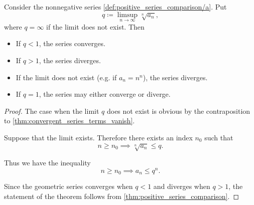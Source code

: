 \begin{proposition}\label{thm:cauchys_root_test}\cite[theorem 3.33]{Rudin1991}
  Consider the nonnegative series \cref{def:positive_series_comparison/a}. Put
  \begin{equation*}
    q \coloneqq \limsup_{n \to \infty} \sqrt[n]{a_n},
  \end{equation*}
  where \( q = \infty \) if the limit does not exist. Then
  \begin{itemize}
    \item If \( q < 1 \), the series converges.
    \item If \( q > 1 \), the series diverges.
    \item If the limit does not exist (e.g. if \( a_n = n^n \)), the series diverges.
    \item If \( q = 1 \), the series may either converge or diverge.
  \end{itemize}
\end{proposition}
\begin{proof}
  The case when the limit \( q \) does not exist is obvious by the contraposition to \cref{thm:convergent_series_terms_vanish}.

  Suppose that the limit exists. Therefore there exists an index \( n_0 \) such that
  \begin{equation*}
    n \geq n_0 \implies \sqrt[n]{a_n} \leq q.
  \end{equation*}

  Thus we have the inequality
  \begin{equation*}
    n \geq n_0 \implies a_n \leq q^n.
  \end{equation*}

  Since the geometric series converges when \( q < 1 \) and diverges when \( q > 1 \), the statement of the theorem follows from \cref{thm:positive_series_comparison}.
\end{proof}

